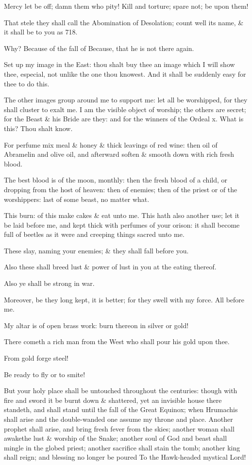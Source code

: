 Mercy let be off; damn them who pity! Kill and torture; spare not; be upon them!

That stele they shall call the Abomination of Desolation; count well its name, \& it shall be to you as 718.

Why? Because of the fall of Because, that he is not there again.

Set up my image in the East: thou shalt buy thee an image which I will show thee, especial, not unlike the one thou knowest. And it shall be suddenly easy for thee to do this.

The other images group around me to support me: let all be worshipped, for they shall cluster to exalt me. I am the visible object of worship; the others are secret; for the Beast \& his Bride are they: and for the winners of the Ordeal x. What is this? Thou shalt know.

For perfume mix meal \& honey \& thick leavings of red wine: then oil of Abramelin and olive oil, and afterward soften \& smooth down with rich fresh blood.

The best blood is of the moon, monthly: then the fresh blood of a child, or dropping from the host of heaven: then of enemies; then of the priest or of the worshippers: last of some beast, no matter what.

This burn: of this make cakes \& eat unto me. This hath also another use; let it be laid before me, and kept thick with perfumes of your orison: it shall become full of beetles as it were and creeping things sacred unto me.

These slay, naming your enemies; \& they shall fall before you.

Also these shall breed lust \& power of lust in you at the eating thereof.

Also ye shall be strong in war.

Moreover, be they long kept, it is better; for they swell with my force. All before me.

My altar is of open brass work: burn thereon in silver or gold!

There cometh a rich man from the West who shall pour his gold upon thee.

From gold forge steel!

Be ready to fly or to smite!

But your holy place shall be untouched throughout the centuries: though with fire and sword it be burnt down \& shattered, yet an invisible house there standeth, and shall stand until the fall of the Great Equinox; when Hrumachis shall arise and the double-wanded one assume my throne and place. Another prophet shall arise, and bring fresh fever from the skies; another woman shall awakethe lust \& worship of the Snake; another soul of God and beast shall mingle in the globed priest; another sacrifice shall stain the tomb; another king shall reign; and blessing no longer be poured To the Hawk-headed mystical Lord!

